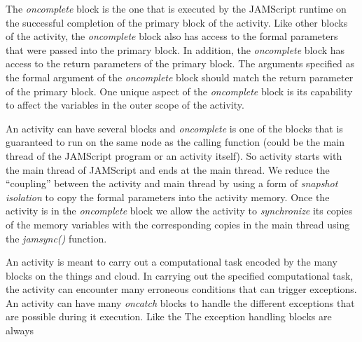 \documentclass[11pt]{article}
\begin{document}
The {\em oncomplete} block is the one that is executed by the JAMScript runtime
on the successful completion of the primary block of the activity. Like other
blocks of the activity, the {\em oncomplete} block also has access to the formal
parameters that were passed into the primary block. In addition, the {\em
oncomplete} block has access to the return parameters of the primary block. The
arguments specified as the formal argument of the {\em oncomplete} block should
match the return parameter of the primary block. One unique aspect of the {\em
oncomplete} block is its capability to affect the variables in the outer scope
of the activity.


An activity can have several blocks and {\em oncomplete} is one of the blocks
that is guaranteed to run on
the same node as the calling function (could be the main thread of the JAMScript
program or an activity itself).
So activity starts with the main thread of JAMScript and ends at the main thread.
We reduce the ``coupling'' between the activity and main thread by using
a form of {\em snapshot isolation} to copy the formal parameters into the activity
memory. Once the activity is in the {\em oncomplete} block we allow the activity
to {\em synchronize} its copies of the memory variables with the corresponding
copies in the main thread using the {\em jamsync()} function.



An activity is meant to carry out a computational task encoded by the many
blocks on the things and cloud. In carrying out the specified computational task,
the activity can encounter many erroneous conditions that can trigger exceptions.
An activity can have many {\em oncatch} blocks to handle the different exceptions
that are possible during it execution. Like the The exception handling {\oncatch} blocks
are always







\end{document}
